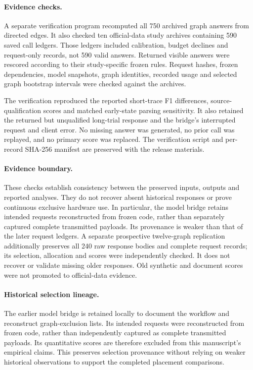 \paragraph{Evidence checks.} A separate verification program recomputed all 750 archived graph answers from directed edges. It also checked ten official-data study archives containing 590 saved call ledgers. Those ledgers included calibration, budget declines and request-only records, not 590 valid answers. Returned visible answers were rescored according to their study-specific frozen rules. Request hashes, frozen dependencies, model snapshots, graph identities, recorded usage and selected graph bootstrap intervals were checked against the archives.

The verification reproduced the reported short-trace F1 differences, source-qualification scores and matched early-state parsing sensitivity. It also retained the returned but unqualified long-trial response and the bridge's interrupted request and client error. No missing answer was generated, no prior call was replayed, and no primary score was replaced. The verification script and per-record SHA-256 manifest are preserved with the release materials.

\paragraph{Evidence boundary.} These checks establish consistency between the preserved inputs, outputs and reported analyses. They do not recover absent historical responses or prove continuous exclusive hardware use. In particular, the model bridge retains intended requests reconstructed from frozen code, rather than separately captured complete transmitted payloads. Its provenance is weaker than that of the later request ledgers. A separate prospective twelve-graph replication additionally preserves all 240 raw response bodies and complete request records; its selection, allocation and scores were independently checked. It does not recover or validate missing older responses. Old synthetic and document scores were not promoted to official-data evidence.


\paragraph{Historical selection lineage.} The earlier model bridge is retained locally to document the workflow and reconstruct graph-exclusion lists. Its intended requests were reconstructed from frozen code, rather than independently captured as complete transmitted payloads. Its quantitative scores are therefore excluded from this manuscript's empirical claims. This preserves selection provenance without relying on weaker historical observations to support the completed placement comparisons.

